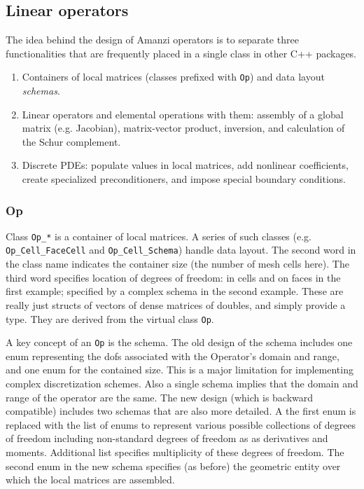 \subsection{Linear operators}
The idea behind the design of Amanzi operators is to separate three 
functionalities that are frequently placed in a single class in other
C++ packages.

\begin{enumerate}
\item Containers of local matrices (classes prefixed with {\tt Op}) and 
      data layout {\it schemas}.

\item Linear operators and elemental operations with them: assembly of a global 
      matrix (e.g. Jacobian), matrix-vector product, inversion, and calculation of the Schur complement.

\item Discrete PDEs: populate values in local matrices, add nonlinear 
coefficients, create specialized preconditioners, and impose special
boundary conditions. 
\end{enumerate}


\subsubsection{Op}
Class {\tt Op\_*} is a container of local matrices.
A series of such classes (e.g. {\tt Op\_Cell\_FaceCell} and {\tt Op\_Cell\_Schema}) handle data layout. 
The second word in the class name indicates the container size (the number of mesh cells here).
The third word specifies location of degrees of freedom: in cells and on faces in the first example;
specified by a complex schema in the second example.
These are really just structs of vectors of
dense matrices of doubles, and simply provide a type.
They are derived from the virtual class {\tt Op}.

A key concept of an {\tt Op} is the schema. 
The old design of the schema includes one enum representing the dofs associated
with the Operator's domain and range, and one enum for the contained size. 
This is a major limitation for implementing complex discretization schemes.
Also a single schema implies that the domain and range of the operator are the same.
The new design (which is backward compatible) includes two schemas that are also more 
detailed. A the first enum is replaced with the list of enums to represent various 
possible collections of degrees of freedom including non-standard degrees of freedom 
as as derivatives and moments.
Additional list specifies multiplicity of these degrees of freedom.
The second enum in the new schema specifies (as before) the geometric entity over which the local 
matrices are assembled.

